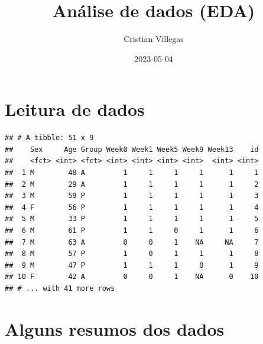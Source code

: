 \documentclass[
]{article}
\title{Análise de dados (EDA)}
\author{Cristian Villegas}
\date{2023-05-04}
\newenvironment{Shaded}{\begin{snugshade}}{\end{snugshade}}
\newcommand{\AttributeTok}[1]{\textcolor[rgb]{0.77,0.63,0.00}{#1}}
\newcommand{\ConstantTok}[1]{\textcolor[rgb]{0.00,0.00,0.00}{#1}}
\newcommand{\DecValTok}[1]{\textcolor[rgb]{0.00,0.00,0.81}{#1}}
\newcommand{\FunctionTok}[1]{\textcolor[rgb]{0.00,0.00,0.00}{#1}}
\newcommand{\NormalTok}[1]{#1}
\newcommand{\OtherTok}[1]{\textcolor[rgb]{0.56,0.35,0.01}{#1}}
\newcommand{\SpecialCharTok}[1]{\textcolor[rgb]{0.00,0.00,0.00}{#1}}
\newcommand{\StringTok}[1]{\textcolor[rgb]{0.31,0.60,0.02}{#1}}
\begin{document}
\maketitle

{
\setcounter{tocdepth}{2}
\tableofcontents
}
\hypertarget{leitura-de-dados}{%
\section{Leitura de dados}\label{leitura-de-dados}}

\begin{Shaded}
\end{Shaded}

\begin{verbatim}
## # A tibble: 51 x 9
##    Sex     Age Group Week0 Week1 Week5 Week9 Week13    id
##    <fct> <int> <fct> <int> <int> <int> <int>  <int> <int>
##  1 M        48 A         1     1     1     1      1     1
##  2 M        29 A         1     1     1     1      1     2
##  3 M        59 P         1     1     1     1      1     3
##  4 F        56 P         1     1     1     1      1     4
##  5 M        33 P         1     1     1     1      1     5
##  6 M        61 P         1     1     0     1      1     6
##  7 M        63 A         0     0     1    NA     NA     7
##  8 M        57 P         1     0     1     1      1     8
##  9 M        47 P         1     1     1     0      1     9
## 10 F        42 A         0     0     1    NA      0    10
## # ... with 41 more rows
\end{verbatim}

\hypertarget{alguns-resumos-dos-dados}{%
\section{Alguns resumos dos dados}\label{alguns-resumos-dos-dados}}
\end{document}

